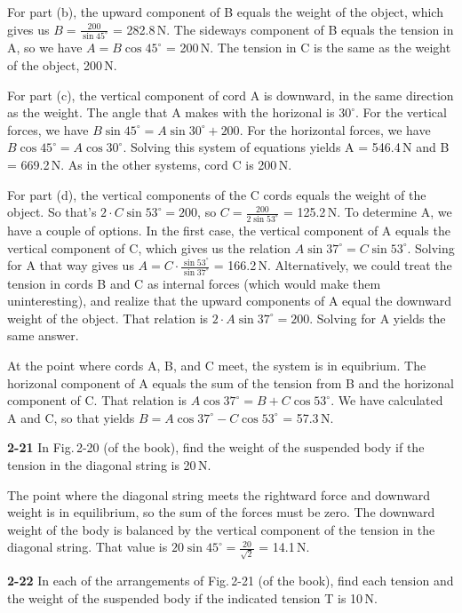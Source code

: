 \documentclass{amsart}
\begin{document}
For part (b), the upward component of B equals the weight of the object,
which gives us $B = \frac{200}{\sin 45^\circ}$ = 282.8\,N.
The sideways component of B equals the tension in A,
so we have $A = B \cos 45^\circ$ = 200\,N.
The tension in C is the same as the weight of the object, 200\,N.

For part (c), the vertical component of cord A is downward,
in the same direction as the weight.
The angle that A makes with the horizonal is $30^\circ$.
For the vertical forces, we have $B \sin 45^\circ = A \sin 30^\circ + 200$.
For the horizontal forces, we have $B \cos 45^\circ = A \cos 30^\circ$.
Solving this system of equations yields A = 546.4\,N and B = 669.2\,N.
As in the other systems, cord C is 200\,N.

For part (d), the vertical components of the C cords equals the weight
of the object.  So that's $2 \cdot C \sin 53^\circ = 200$,
so $C = \frac{200}{2 \sin 53^\circ}$ = 125.2\,N.
To determine A, we have a couple of options.
In the first case, the vertical component of A equals the vertical component of C,
which gives us the relation $A \sin 37^\circ = C \sin 53^\circ$.
Solving for A that way gives us $A = C \cdot \frac{\sin 53^\circ}{\sin 37^\circ}$ = 166.2\,N.
Alternatively, we could treat the tension in cords B and C as internal forces
(which would make them uninteresting),
and realize that the upward components of A equal the downward weight of the object.
That relation is $2 \cdot A \sin 37^\circ = 200$.
Solving for A yields the same answer.

At the point where cords A, B, and C meet, the system is in equibrium.
The horizonal component of A equals the sum of the tension from B
and the horizonal component of C.
That relation is $A \cos 37^\circ = B + C \cos 53^\circ$.
We have calculated A and C,
so that yields $B = A \cos 37^\circ - C \cos 53^\circ$ = 57.3\,N.

\vspace{\baselineskip}
\noindent
\textbf{2-21} In Fig.\,2-20 (of the book), find the weight of the suspended body if the
tension in the diagonal string is 20\,N.

The point where the diagonal string meets the rightward force and downward weight is
in equilibrium, so the sum of the forces must be zero.
The downward weight of the body is balanced by the vertical
component of the tension in the diagonal string.
That value is $20 \sin 45^\circ = \frac{20}{\sqrt{2}}$ = 14.1\,N.

\vspace{\baselineskip}
\noindent
\textbf{2-22} In each of the arrangements of Fig.\,2-21 (of the book),
find each tension and the weight of the suspended body if the indicated
tension T is 10\,N.
\end{document}
